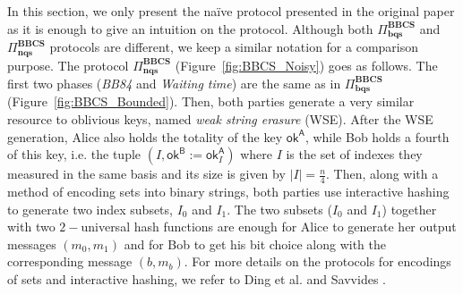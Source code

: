 In this section, we only present the na\"ive protocol presented in the original paper \cite{KWW12} as it is enough to give an intuition on the protocol. Although both $\Pi^{\textbf{BBCS}}_{\textbf{bqs}}$ and $\Pi^{\textbf{BBCS}}_{\textbf{nqs}}$ protocols are different, we keep a similar notation for a comparison purpose. The protocol $\Pi^{\textbf{BBCS}}_{\textbf{nqs}}$ (Figure~\ref{fig:BBCS_Noisy}) goes as follows. The first two phases (\textit{BB84} and \textit{Waiting time}) are the same as in $\Pi^{\textbf{BBCS}}_{\textbf{bqs}}$ (Figure~\ref{fig:BBCS_Bounded}). Then, both parties generate a very similar resource to oblivious keys, named \textit{weak string erasure} (WSE). After the WSE generation, Alice also holds the totality of the key $\mathsf{ok}^{\mathsf{A}}$, while Bob holds a fourth of this key, i.e. the tuple $(I, \mathsf{ok}^{\mathsf{B}} := \mathsf{ok}^{\mathsf{A}}_I)$ where $I$ is the set of indexes they measured in the same basis and its size is given by $|I| = \frac{n}{4}$. Then, along with a method of encoding sets into binary strings, both parties use interactive hashing to generate two index subsets, $I_0$ and $I_1$. The two subsets ($I_0$ and $I_1$) together with two $2-$universal hash functions are enough for Alice to generate her output messages $(m_0, m_1)$ and for Bob to get his bit choice along with the corresponding message $(b, m_b)$. For more details on the protocols for encodings of sets and interactive hashing, we refer to Ding et al. \cite{DHRS04} and Savvides \cite{S07}.

